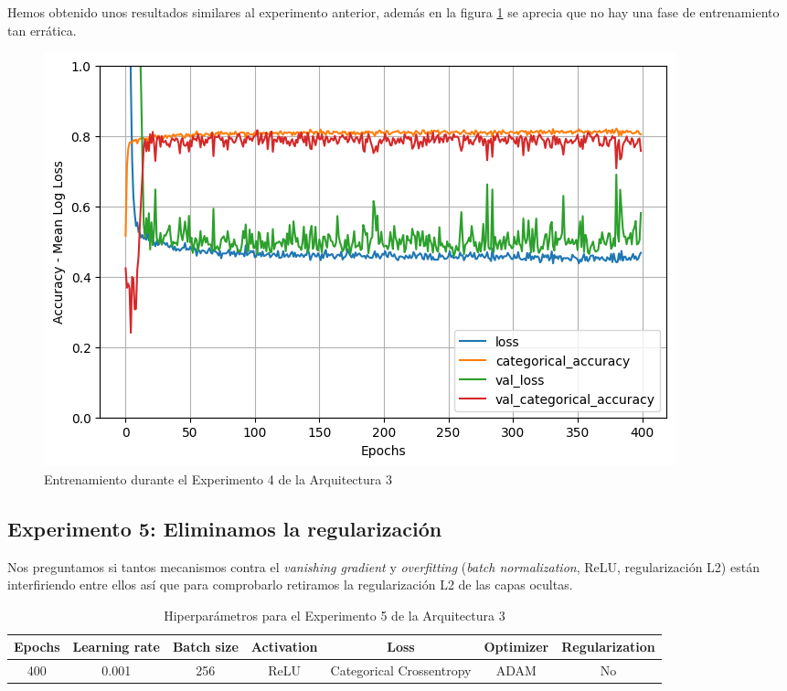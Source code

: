 \documentclass{article}
\begin{document}
			Hemos obtenido unos resultados similares al experimento anterior, adem\'as en la figura \ref{tr-a3-e4} se aprecia que no hay una fase de entrenamiento tan err\'atica.
			\begin{figure}[!h]
				\begin{center}
					\includegraphics[scale=0.5]{tr-a3-e4.png}		
					\caption{Entrenamiento durante el Experimento 4 de la Arquitectura 3}	
					\label{tr-a3-e4}
				\end{center}
			\end{figure}
			
		\subsection{Experimento 5: Eliminamos la regularizaci\'on}
		\label{s-a3-e5}
			Nos preguntamos si tantos mecanismos contra el \textit{vanishing gradient} y \textit{overfitting} (\textit{batch normalization}, ReLU, regularizaci\'on L2) est\'an interfiriendo entre ellos as\'i que para comprobarlo retiramos la regularizaci\'on L2 de las capas ocultas.
			\begin{table}[!h]
				\begin{tabular}{| c | c | c | c | c | c | c |}
					\textbf{Epochs} & \textbf{Learning rate} & \textbf{Batch size} & \textbf{Activation} & \textbf{Loss} & \textbf{Optimizer} & \textbf{Regularization} \\ \hline
					400 & 0.001 & 256 & ReLU & Categorical Crossentropy & ADAM & No
				\end{tabular}
				\caption{Hiperpar\'ametros para el Experimento 5 de la Arquitectura 3}
				\label{tab:hip-a3-e5}
			\end{table}
			
\end{document}
